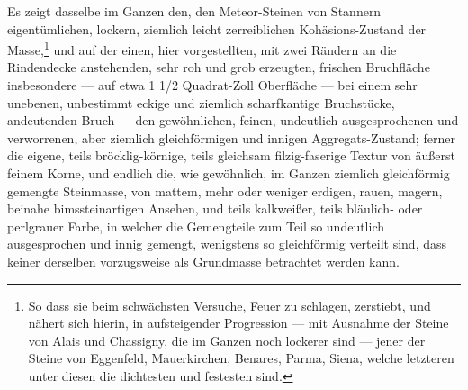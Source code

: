 \documentclass[a4paper, 11pt, oneside, german]{article}
\begin{document}
Es zeigt dasselbe im Ganzen den, den Meteor-Steinen von Stannern eigentümlichen, lockern, ziemlich leicht zerreiblichen Kohäsions-Zustand der Masse,\footnote{So dass sie beim schwächsten Versuche, Feuer zu schlagen, zerstiebt, und nähert sich hierin, in aufsteigender Progression --- mit Ausnahme der Steine von Alais und Chassigny, die im Ganzen noch lockerer sind --- jener der Steine von Eggenfeld, Mauerkirchen, Benares, Parma, Siena, welche letzteren unter diesen die dichtesten und festesten sind.} und auf der einen, hier vorgestellten, mit zwei Rändern an die Rindendecke anstehenden, sehr roh und grob erzeugten, frischen Bruchfläche insbesondere --- auf etwa 1 1/2 Quadrat-Zoll Oberfläche --- bei einem sehr unebenen, unbestimmt eckige und ziemlich scharfkantige Bruchstücke, andeutenden Bruch --- den gewöhnlichen, feinen, undeutlich ausgesprochenen und verworrenen, aber ziemlich gleichförmigen und innigen Aggregats-Zustand; ferner die eigene, teils bröcklig-körnige, teils gleichsam filzig-faserige Textur von äußerst feinem Korne, und endlich die, wie gewöhnlich, im Ganzen ziemlich gleichförmig gemengte Steinmasse, von mattem, mehr oder weniger erdigen, rauen, magern, beinahe bimssteinartigen Ansehen, und teils kalkweißer, teils bläulich- oder perlgrauer Farbe, in welcher die Gemengteile zum Teil so undeutlich ausgesprochen und innig gemengt, wenigstens so gleichförmig verteilt sind, dass keiner derselben vorzugsweise als Grundmasse betrachtet werden kann.
\end{document}
